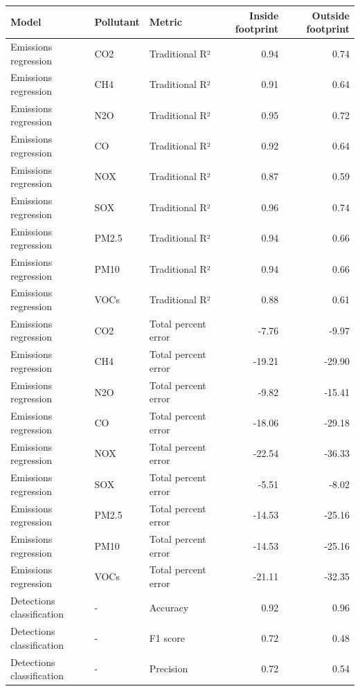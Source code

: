 \documentclass[lineno,pdflatex,sn-nature]{sn-jnl}
\providecommand{\DIFaddbeginFL}{} %
\providecommand{\DIFdelendFL}{} %
\providecommand{\DIFaddincludegraphics}[2][]{{\color{blue}\fbox{\DIFOincludegraphics[#1]{#2}}}} %
\DeclareRobustCommand{\DIFaddbeginFL}{\DIFOaddbeginFL \let\includegraphics\DIFaddincludegraphics} %
\DeclareRobustCommand{\DIFdelendFL}{\DIFOaddendFL \let\includegraphics\DIFOincludegraphics} %
\begin{document}
\begin{table}[!h]
\DIFdelendFL \DIFaddbeginFL \begin{tabular}[t]{l|l|l|r|r}
\hline
Model & Pollutant & Metric & Inside footprint & Outside footprint\\
\hline
Emissions regression & CO2 & Traditional R² & 0.94 & 0.74\\
\hline
Emissions regression & CH4 & Traditional R² & 0.91 & 0.64\\
\hline
Emissions regression & N2O & Traditional R² & 0.95 & 0.72\\
\hline
Emissions regression & CO & Traditional R² & 0.92 & 0.64\\
\hline
Emissions regression & NOX & Traditional R² & 0.87 & 0.59\\
\hline
Emissions regression & SOX & Traditional R² & 0.96 & 0.74\\
\hline
Emissions regression & PM2.5 & Traditional R² & 0.94 & 0.66\\
\hline
Emissions regression & PM10 & Traditional R² & 0.94 & 0.66\\
\hline
Emissions regression & VOCs & Traditional R² & 0.88 & 0.61\\
\hline
Emissions regression & CO2 & Total percent error & -7.76 & -9.97\\
\hline
Emissions regression & CH4 & Total percent error & -19.21 & -29.90\\
\hline
Emissions regression & N2O & Total percent error & -9.82 & -15.41\\
\hline
Emissions regression & CO & Total percent error & -18.06 & -29.18\\
\hline
Emissions regression & NOX & Total percent error & -22.54 & -36.33\\
\hline
Emissions regression & SOX & Total percent error & -5.51 & -8.02\\
\hline
Emissions regression & PM2.5 & Total percent error & -14.53 & -25.16\\
\hline
Emissions regression & PM10 & Total percent error & -14.53 & -25.16\\
\hline
Emissions regression & VOCs & Total percent error & -21.11 & -32.35\\
\hline
Detections classification & - & Accuracy & 0.92 & 0.96\\
\hline
Detections classification & - & F1 score & 0.72 & 0.48\\
\hline
Detections classification & - & Precision & 0.72 & 0.54\\

\end{tabular}
\end{table}
\end{document}
